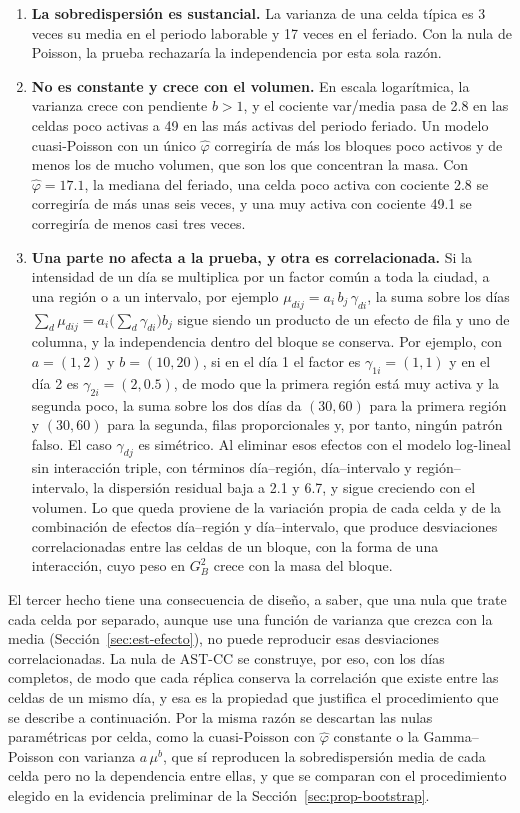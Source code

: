 \begin{enumerate}
  \item \textbf{La sobredispersión es sustancial.} La varianza de una celda
  típica es 3 veces su media en el periodo laborable y 17 veces en el feriado.
  Con la nula de Poisson, la prueba rechazaría la independencia por esta sola
  razón.
  \item \textbf{No es constante y crece con el volumen.} En escala logarítmica,
  la varianza crece con pendiente $b > 1$, y el cociente var/media pasa de 2.8 en
  las celdas poco activas a 49 en las más activas del periodo feriado. Un modelo
  cuasi-Poisson con un único $\hat\varphi$ corregiría de más los bloques poco
  activos y de menos los de mucho volumen, que son los que concentran la masa. Con
$\hat\varphi = 17.1$, la mediana del feriado, una celda poco activa con cociente
2.8 se corregiría de más unas seis veces, y una muy activa con cociente 49.1 se
corregiría de menos casi tres veces.
  \item \textbf{Una parte no afecta a la prueba, y otra es correlacionada.} Si
  la intensidad de un día se multiplica por un factor común a toda la ciudad, a
  una región o a un intervalo, por ejemplo $\mu_{dij} = a_i\, b_j\,
  \gamma_{di}$, la suma sobre los días
  $\sum_d \mu_{dij} = a_i \bigl(\sum_d \gamma_{di}\bigr) b_j$ sigue siendo un
  producto de un efecto de fila y uno de columna, y la independencia dentro del
  bloque se conserva. Por ejemplo, con $a=(1,2)$ y $b=(10,20)$, si en el día 1 el
factor es $\gamma_{1i}=(1,1)$ y en el día 2 es $\gamma_{2i}=(2,0.5)$, de modo que
la primera región está muy activa y la segunda poco, la suma sobre los dos días da
$(30,60)$ para la primera región y $(30,60)$ para la segunda, filas proporcionales
y, por tanto, ningún patrón falso. El caso $\gamma_{dj}$ es simétrico. Al eliminar esos
  efectos con el modelo log-lineal sin interacción triple, con términos
  día--región, día--intervalo y región--intervalo, la dispersión residual baja a
  2.1 y 6.7, y sigue creciendo con el volumen. Lo que queda proviene de la
  variación propia de cada celda y de la combinación de efectos
  día--región y día--intervalo, que produce desviaciones correlacionadas entre
  las celdas de un bloque, con la forma de una interacción, cuyo peso en
  $G^2_B$ crece con la masa del bloque.
\end{enumerate}

El tercer hecho tiene una consecuencia de diseño, a saber, que una nula que trate cada celda
por separado, aunque use una función de varianza que crezca con la media
(Sección~\ref{sec:est-efecto}), no puede reproducir esas desviaciones
correlacionadas. La nula de AST-CC se construye, por eso, con los días
completos, de modo que cada réplica conserva la correlación que existe entre las
celdas de un mismo día, y esa es la propiedad que justifica el procedimiento que
se describe a continuación. Por la misma razón se descartan las nulas
paramétricas por celda, como la cuasi-Poisson con $\hat\varphi$ constante o la
Gamma--Poisson con varianza $a\,\mu^b$, que sí reproducen la sobredispersión
media de cada celda pero no la dependencia entre ellas, y que se comparan con el
procedimiento elegido en la evidencia preliminar de la
Sección~\ref{sec:prop-bootstrap}.


